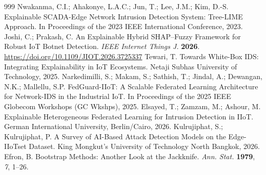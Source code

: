 \begin{thebibliography}{999}
Nwakanma, C.I.; Ahakonye, L.A.C.; Jun, T.; Lee, J.M.; Kim, D.-S. Explainable SCADA-Edge Network Intrusion Detection System: Tree-LIME Approach. In Proceedings of the 2023 IEEE International Conference, 2023.
Joshi, C.; Prakash, C. An Explainable Hybrid SHAP--Fuzzy Framework for Robust IoT Botnet Detection. \textit{IEEE Internet Things J.} \textbf{2026}. \url{https://doi.org/10.1109/JIOT.2026.3725337}
Tewari, T. Towards White-Box IDS: Integrating Explainability in IoT Ecosystems. Netaji Subhas University of Technology, 2025.
Narkedimilli, S.; Makam, S.; Sathish, T.; Jindal, A.; Dewangan, N.K.; Mallellu, S.P. FedGuard-IIoT: A Scalable Federated Learning Architecture for Network-IDS in the Industrial IoT. In Proceedings of the 2025 IEEE Globecom Workshops (GC Wkshps), 2025.
Elsayed, T.; Zamzam, M.; Ashour, M. Explainable Heterogeneous Federated Learning for Intrusion Detection in IIoT. German International University, Berlin/Cairo, 2026.
Kulrujiphat, S.; Kulrujiphat, P. A Survey of AI-Based Attack Detection Models on the Edge-IIoTset Dataset. King Mongkut's University of Technology North Bangkok, 2026.
Efron, B. Bootstrap Methods: Another Look at the Jackknife. \textit{Ann. Stat.} \textbf{1979}, \textit{7}, 1--26.
\end{thebibliography}

